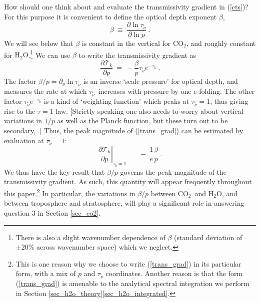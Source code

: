 \documentclass{ametsoc}
\newcommand{\beqn}{\begin{equation}}
\newcommand{\eeqn}{\end{equation}}
\newcommand{\eqnref}[1]{(\ref{#1})}
\newcommand{\partialder}[2]{\ensuremath{\frac{\partial #1}{\partial #2}}}
\newcommand{\ppp}{\ensuremath{\partial_p}}
\newcommand{\cotwo}{\ensuremath{\mathrm{CO_2}}}
\newcommand{\htwo}{\ensuremath{\mathrm{H_2O}}}
\newcommand{\wv}{\ensuremath{\widetilde{\nu}}}
\newcommand{\trans}{\ensuremath{\mathcal{T}}}
\newcommand{\tauk}{\ensuremath{\tau_{\wv}}}
\newcommand{\taumax}{\ensuremath{\tau_{\text{max}}}}
\begin{document}
 
How should one think about and evaluate the transmissivity gradient in \eqnref{cts}? For this purpose it is convenient to define the optical depth exponent $\beta$, 
\beqn
		\beta \  \equiv  \ \partialder{\ln \tauk}{\ln p} \ . 
		\label{beta_def}
\eeqn
We will see below that $\beta$ is constant in the vertical for \cotwo, and roughly constant for \htwo.\footnote{There is also a slight wavenumber dependence of $\beta$ (standard deviation of $\pm 20\%$ across wavenumber space) which we neglect.}
We can use $\beta$ to write the transmissivity gradient as 
 \beqn
 		\partialder{\trans_k}{p} \  =  \ -\frac{\beta}{p} \tauk e^{-\tauk}  \ .
		 \label{trans_grad} 
\eeqn
The factor $\beta/p=\ppp\ln\tauk$  is an inverse  `scale pressure' for optical depth, and measures the rate at which  \tauk\ increases with pressure by one $e$-folding. The other factor  $\tauk e^{-\tauk}$ is a kind of `weighting function' which peaks at $\tauk=1$, thus giving rise to  the $\tau=1$ law.  [Strictly speaking one also needs to worry about vertical variations in $1/p$ as well as the Planck function, but these turn out to be secondary, \cite{jeevanjee2019b}.] Thus, the peak magnitude of \eqnref{trans_grad} can be estimated by evaluation  at $\tauk=1$:
\beqn
	\left. \partialder{\trans_k}{p} \right |_{\tauk=1}  \ =  \ -\ \frac{1}{e}\frac{\beta}{p} \ .
	\label{trans_grad_tau1}
\eeqn
 We thus have the key result that $\beta/p$ governs the peak magnitude of the transmissivity gradient. As such, this quantity will appear frequently  throughout this paper.\footnote{This is one reason why we choose to write \eqnref{trans_grad} in its particular form, with a mix of $p$ and $\tauk$ coordinates. Another reason is that the form \eqnref{trans_grad} is amenable to the analytical spectral integration we perform in Section \ref{sec_h2o_theory}\ref{sec_h2o_integrated}.} 
In particular, the variations in $\beta/p$ between  \cotwo\ and \htwo, and between troposphere and stratosphere, will  play a significant role in answering question 3 in Section \ref{sec_co2}. 
 
\end{document}
